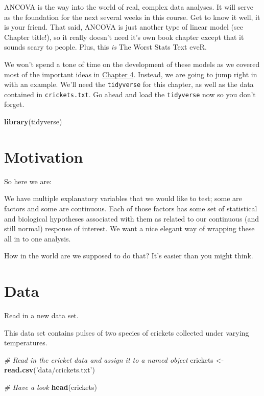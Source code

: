 \documentclass[
]{book}
\newenvironment{Shaded}{\begin{snugshade}}{\end{snugshade}}
\newcommand{\CommentTok}[1]{\textcolor[rgb]{0.56,0.35,0.01}{\textit{#1}}}
\newcommand{\KeywordTok}[1]{\textcolor[rgb]{0.13,0.29,0.53}{\textbf{#1}}}
\newcommand{\NormalTok}[1]{#1}
\newcommand{\StringTok}[1]{\textcolor[rgb]{0.31,0.60,0.02}{#1}}
\begin{document}
ANCOVA is the way into the world of real, complex data analyses. It will serve as the foundation for the next several weeks in this course. Get to know it well, it is your friend. That said, ANCOVA is just another type of linear model (see Chapter title!), so it really doesn't need it's own book chapter except that it sounds scary to people. Plus, this \emph{is} The Worst Stats Text eveR.

We won't spend a tone of time on the development of these models as we covered most of the important ideas in \protect\hyperlink{Chapter4}{Chapter 4}. Instead, we are going to jump right in with an example. We'll need the \texttt{tidyverse} for this chapter, as well as the data contained in \texttt{crickets.txt}. Go ahead and load the \texttt{tidyverse} now so you don't forget.

\begin{Shaded}
\begin{Highlighting}[]
\KeywordTok{library}\NormalTok{(tidyverse)}
\end{Highlighting}
\end{Shaded}

\hypertarget{motivation}{%
\section{Motivation}\label{motivation}}

So here we are:

We have multiple explanatory variables that we would like to test; some are factors and some are continuous. Each of those factors has some set of statistical and biological hypotheses associated with them as related to our continuous (and still normal) response of interest. We want a nice elegant way of wrapping these all in to one analysis.

How in the world are we supposed to do that? It's easier than you might think.

\hypertarget{data}{%
\section{Data}\label{data}}

Read in a new data set.

This data set contains pulses of two species of crickets collected under varying temperatures.

\begin{Shaded}
\begin{Highlighting}[]
\CommentTok{# Read in the cricket data and assign it to a named object}
\NormalTok{crickets <-}\StringTok{ }\KeywordTok{read.csv}\NormalTok{(}\StringTok{'data/crickets.txt'}\NormalTok{)}

\CommentTok{# Have a look}
\KeywordTok{head}\NormalTok{(crickets)}
\end{Highlighting}
\end{Shaded}
\end{document}
